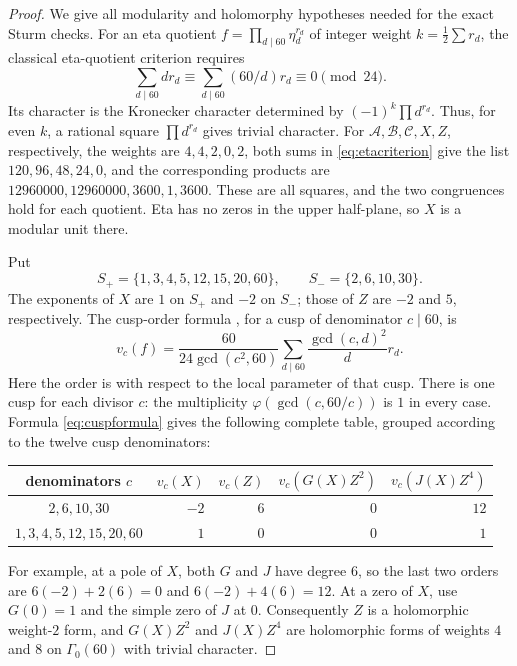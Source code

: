 \documentclass[11pt,a4paper]{article}
\theoremstyle{remark}
\begin{document}
\begin{proof}
We give all modularity and holomorphy hypotheses needed for the exact
Sturm checks. For an eta quotient
$f=\prod_{d\mid60}\eta_d^{r_d}$ of integer weight
$k=\tfrac12\sum r_d$, the classical eta-quotient criterion
\cite{Newman,Ligozat} requires
\begin{equation}\label{eq:etacriterion}
 \sum_{d\mid60}d r_d\equiv
 \sum_{d\mid60}(60/d)r_d\equiv0\pmod {24}.
\end{equation}
Its character is the Kronecker character determined by
$(-1)^k\prod d^{r_d}$. Thus, for even $k$, a rational square
$\prod d^{r_d}$ gives trivial character. For
$\mathcal A,\mathcal B,\mathcal C,X,Z$, respectively, the weights are
$4,4,2,0,2$, both sums in \eqref{eq:etacriterion} give the list
$120,96,48,24,0$, and the corresponding products are
$12960000,12960000,3600,1,3600$. These are all squares, and the two
congruences hold for each quotient. Eta has no zeros in the upper
half-plane, so $X$ is a modular unit there.

Put
\[
 S_+=\{1,3,4,5,12,15,20,60\},\qquad S_-=\{2,6,10,30\}.
\]
The exponents of $X$ are $1$ on $S_+$ and $-2$ on $S_-$;
those of $Z$ are $-2$ and $5$, respectively.
The cusp-order formula \cite{Ligozat}, for a cusp of denominator
$c\mid60$, is
\begin{equation}\label{eq:cuspformula}
 v_c(f)=\frac{60}{24\gcd(c^2,60)}
             \sum_{d\mid60}\frac{\gcd(c,d)^2}{d}r_d.
\end{equation}
Here the order is with respect to the local parameter of that cusp.
There is one cusp for each divisor $c$: the multiplicity
$\varphi(\gcd(c,60/c))$ is $1$ in every case. Formula
\eqref{eq:cuspformula} gives the following complete table, grouped
according to the twelve cusp denominators:
\begin{center}
\small
\begin{tabular}{c|rrrr}
denominators $c$&$v_c(X)$&$v_c(Z)$&
$v_c(G(X)Z^2)$&$v_c(J(X)Z^4)$\\ \hline
$2,6,10,30$&$-2$&$6$&$0$&$12$\\
$1,3,4,5,12,15,20,60$&$1$&$0$&$0$&$1$
\end{tabular}
\end{center}
For example, at a pole of $X$, both $G$ and $J$ have degree $6$,
so the last two orders are $6(-2)+2(6)=0$ and
$6(-2)+4(6)=12$. At a zero of $X$, use $G(0)=1$ and the
simple zero of $J$ at $0$. Consequently $Z$ is a holomorphic
weight-$2$ form, and $G(X)Z^2$ and $J(X)Z^4$ are holomorphic forms of
weights $4$ and $8$ on $\Gamma_0(60)$ with trivial character.


\end{proof}
\end{document}
